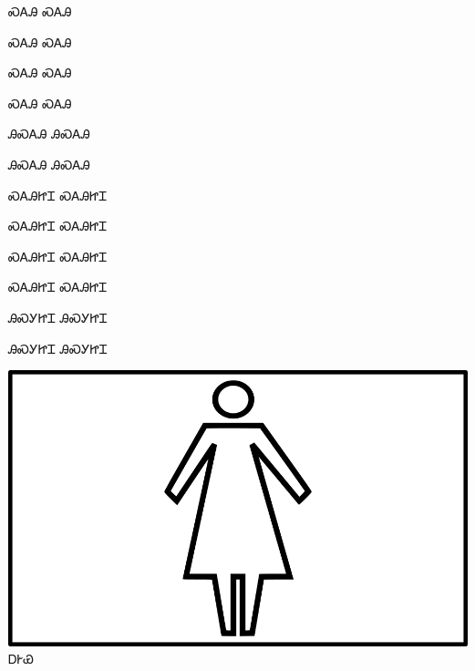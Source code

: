 \documentclass[avery5371]{flashcards}%
\begin{document}
    \begin{flashcard}{\Huge ᏍᎪᎯ}
        \Huge ᏍᎪᎯ
    \end{flashcard}

    \begin{flashcard}{\Huge ᏍᎪᎯ}
        \Huge ᏍᎪᎯ
    \end{flashcard}

    \begin{flashcard}{\Huge ᏍᎪᎯ}
        \Huge ᏍᎪᎯ
    \end{flashcard}

    \begin{flashcard}{\Huge ᏍᎪᎯ}
        \Huge ᏍᎪᎯ
    \end{flashcard}

    \begin{flashcard}{\Huge ᎯᏍᎪᎯ}
        \Huge ᎯᏍᎪᎯ
    \end{flashcard}

    \begin{flashcard}{\Huge ᎯᏍᎪᎯ}
        \Huge ᎯᏍᎪᎯ
    \end{flashcard}

    \begin{flashcard}{\Huge ᏍᎪᎯᏥᏆ}
        \Huge ᏍᎪᎯᏥᏆ
    \end{flashcard}

    \begin{flashcard}{\Huge ᏍᎪᎯᏥᏆ}
        \Huge ᏍᎪᎯᏥᏆ
    \end{flashcard}

    \begin{flashcard}{\Huge ᏍᎪᎯᏥᏆ}
        \Huge ᏍᎪᎯᏥᏆ
    \end{flashcard}

    \begin{flashcard}{\Huge ᏍᎪᎯᏥᏆ}
        \Huge ᏍᎪᎯᏥᏆ
    \end{flashcard}

    \begin{flashcard}{\Huge ᎯᏍᎩᏥᏆ}
        \Huge ᎯᏍᎩᏥᏆ
    \end{flashcard}

    \begin{flashcard}{\Huge ᎯᏍᎩᏥᏆ}
        \Huge ᎯᏍᎩᏥᏆ
    \end{flashcard}


    \begin{flashcard}{
        \includegraphics[width=0.95\columnwidth,height=.51\columnwidth,keepaspectratio]{../artwork/objects-animate/agehya}
    }
        \Huge ᎠᎨᏯ
    \end{flashcard}
\end{document}
